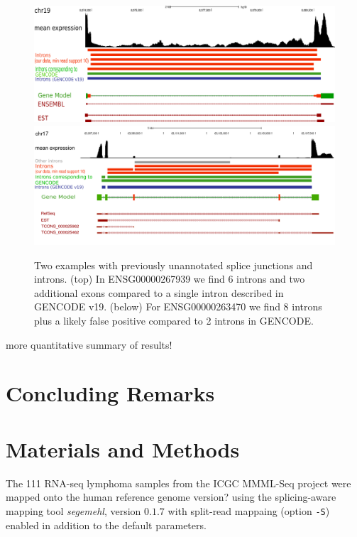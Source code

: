 \documentclass[ncrna,article,submit,moreauthors,pdftex,10pt,a4paper]{mdpi}
\newcommand{\TODO}[1]{\begingroup\color{red}#1\endgroup}
\begin{document}
\begin{figure}[t]
\begin{center}
\includegraphics[width=\textwidth]{267939.pdf}\\[1em]
\includegraphics[width=\textwidth]{example.pdf}
\end{center}
\caption{Two examples with previously unannotated splice junctions and
  introns.  (top) In ENSG00000267939 we find 6 introns and two additional
  exons compared to a single intron described in GENCODE v19.  (below) For
  ENSG00000263470 we find 8 introns plus a likely false positive compared
  to 2 introns in GENCODE.}
\label{fig:examples} 
\end{figure}
  
\TODO{more quantitative summary of results!} 

\section{Concluding Remarks} 
	

\section{Materials and Methods}

The 111 RNA-seq lymphoma samples from the ICGC MMML-Seq project
\cite{Richter:12a} were mapped onto the human reference genome
\TODO{version?} using the splicing-aware mapping tool \textit{segemehl},
version $0.1.7$ \cite{Hoffmann:09a,Hoffmann:14a} with split-read mappaing
(option \texttt{-S}) enabled in addition to the default parameters.
\end{document}
